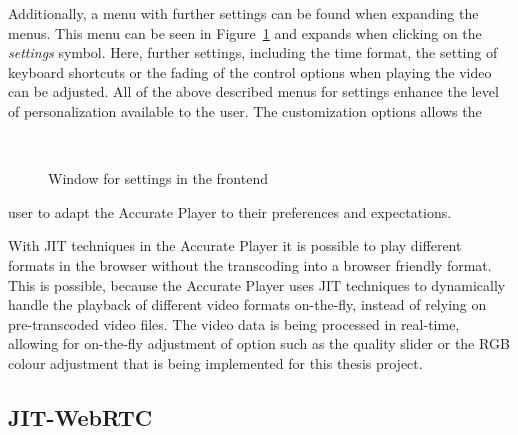 \documentclass[../MasterThesis.tex]{subfiles}
\begin{document}
\begin{minipage}{0.45\textwidth}
	
Additionally, a menu with further settings can be found when expanding the menus. This menu can be seen in Figure~\ref{figure:othercontrols} and expands when clicking on the \textit{settings} symbol. Here, further settings, including the time format, the setting of keyboard shortcuts or the fading of the control options when playing the video can be adjusted. All of the above described menus for settings enhance the level of personalization available to the user. The customization options allows the 
%
%
\end{minipage}\begin{minipage}{0.05\textwidth}
	\ 
\end{minipage}\begin{minipage}{0.5\textwidth}
%
%
\begin{figure}[H]
	\begin{center}
		\caption[Window for settings in the frontend.]{Window for settings in the frontend}
		\label{figure:othercontrols}
	\end{center}
\end{figure}
\vfill
\end{minipage}
%

user to adapt the Accurate Player to their preferences and expectations. 


With JIT techniques in the Accurate Player it is possible to play different formats in the browser without the transcoding into a browser friendly format.
This is possible, because the Accurate Player uses JIT techniques to dynamically handle the playback of different video formats on-the-fly, instead of relying on pre-transcoded video files. The video data is being processed in real-time, allowing for on-the-fly adjustment of option such as the quality slider or the RGB colour adjustment that is being implemented for this thesis project.









\subsection{JIT-WebRTC} \label{subsection:jit-webrtc}
\end{document}
